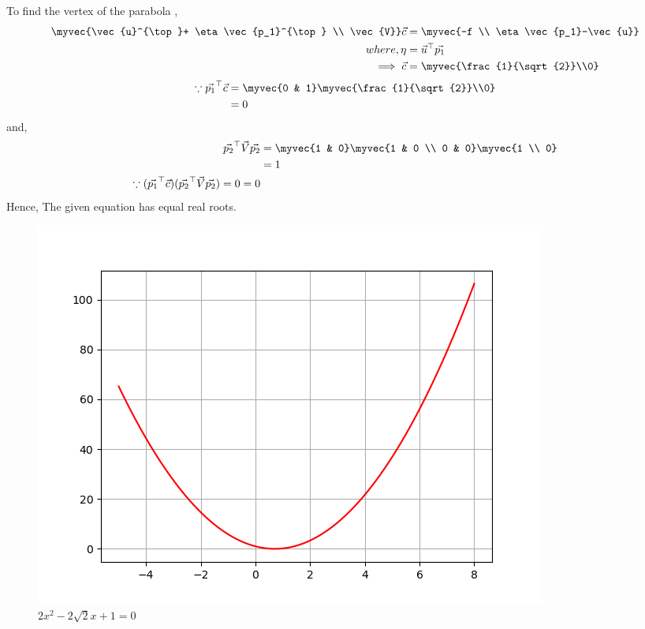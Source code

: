 To find the vertex of the parabola ,
\begin{align}
    \myvec{\vec{u}^{\top}+ \eta \vec{p_1}^{\top} \\ \vec{V}}\vec{c} &= \myvec{-f \\ \eta \vec{p_1}-\vec{u}}\\
    where, \eta &= \vec{u}^{\top}\vec{p_1}\\
    \implies
    \vec{c}&=\myvec{\frac{1}{\sqrt{2}}\\0}
\end{align}
\begin{align}
    \because \vec{p_1}^{\top}\vec{c} &= \myvec{0 & 1}\myvec{\frac{1}{\sqrt{2}}\\0} \\
    &= 0
\end{align}
and,
\begin{align}
    \vec{p_2}^{\top}\vec{V}\vec{p_2}&= \myvec{1 & 0}\myvec{1 & 0 \\ 0 & 0}\myvec{1 \\ 0}\\
    &= 1\\
    \because (\vec{p_1}^{\top}\vec{c}) (\vec{p_2}^{\top}\vec{V}\vec{p_2})=0=0 
\end{align}
Hence, The given equation has equal real roots.
\begin{figure}[htp]
    \centering
    \includegraphics[width=\columnwidth]{solutions/oct/2/21/Figures/Figure_3.png}
    \caption{$2x^2-2\sqrt{2}x+1=0$}
    \label{oct/2/21/fig}
\end{figure}\\
